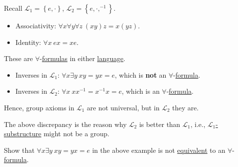 \begin{eg}
	Recall \(\mathcal{L} _1 = \left\{ e, \cdot \right\} \), \(\mathcal{L} _2=\left\{ e, \cdot, ^{-1} \right\} \).
	\begin{itemize}
		\item Associativity: \(\forall x \forall y \forall z\ (xy)z = x(yz)\).
		\item Identity: \(\forall x\ ex = xe\).
	\end{itemize}
	These are \(\forall \)-\hyperref[def:formula]{formulas} in either \hyperref[def:language]{language}.
	\begin{itemize}
		\item Inverses in \(\mathcal{L} _1\): \(\forall x \exists y\ xy = yx = e\), which is \textbf{not} an \(\forall \)-\hyperref[def:formula]{formula}.
		\item Inverses in \(\mathcal{L} _2\): \(\forall x\ x x ^{-1} = x ^{-1} x = e\), which is an \(\forall \)-\hyperref[def:formula]{formula}.
	\end{itemize}
	Hence, group axioms in \(\mathcal{L} _1\) are not universal, but in \(\mathcal{L} _2\) they are.
\end{eg}

The above discrepancy is the reason why \(\mathcal{L} _2\) is better than \(\mathcal{L} _1\), i.e., \hyperref[def:substructure]{\(\mathcal{L} _1\)-substructure} might not be a group.

\begin{problem*}
	Show that \(\forall x \exists y\ xy = yx = e\) in the above example is not \hyperref[def:equivalent]{equivalent} to an \(\forall \)-\hyperref[def:formula]{formula}.
\end{problem*}